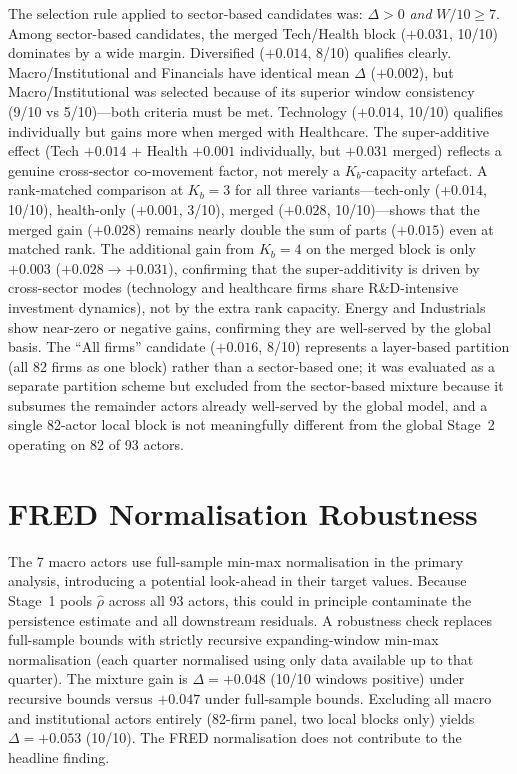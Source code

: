 \documentclass[11pt,a4paper]{article}
\begin{document}
The selection rule applied to sector-based candidates was: $\Delta > 0$ \emph{and} $W/10 \geq 7$. Among sector-based candidates, the merged Tech/Health block ($+0.031$, 10/10) dominates by a wide margin. Diversified ($+0.014$, 8/10) qualifies clearly. Macro/Institutional and Financials have identical mean $\Delta$ ($+0.002$), but Macro/Institutional was selected because of its superior window consistency (9/10 vs 5/10)---both criteria must be met. Technology ($+0.014$, 10/10) qualifies individually but gains more when merged with Healthcare. The super-additive effect (Tech $+0.014$ + Health $+0.001$ individually, but $+0.031$ merged) reflects a genuine cross-sector co-movement factor, not merely a $K_b$-capacity artefact. A rank-matched comparison at $K_b = 3$ for all three variants---tech-only ($+0.014$, 10/10), health-only ($+0.001$, 3/10), merged ($+0.028$, 10/10)---shows that the merged gain ($+0.028$) remains nearly double the sum of parts ($+0.015$) even at matched rank. The additional gain from $K_b = 4$ on the merged block is only $+0.003$ ($+0.028 \to +0.031$), confirming that the super-additivity is driven by cross-sector modes (technology and healthcare firms share R\&D-intensive investment dynamics), not by the extra rank capacity. Energy and Industrials show near-zero or negative gains, confirming they are well-served by the global basis. The ``All firms'' candidate ($+0.016$, 8/10) represents a layer-based partition (all 82 firms as one block) rather than a sector-based one; it was evaluated as a separate partition scheme but excluded from the sector-based mixture because it subsumes the remainder actors already well-served by the global model, and a single 82-actor local block is not meaningfully different from the global Stage~2 operating on 82 of 93 actors.

\section{FRED Normalisation Robustness}
\label{app:fred}

The 7 macro actors use full-sample min-max normalisation in the primary analysis, introducing a potential look-ahead in their target values. Because Stage~1 pools $\hat\rho$ across all 93 actors, this could in principle contaminate the persistence estimate and all downstream residuals. A robustness check replaces full-sample bounds with strictly recursive expanding-window min-max normalisation (each quarter normalised using only data available up to that quarter). The mixture gain is $\Delta = +0.048$ (10/10 windows positive) under recursive bounds versus $+0.047$ under full-sample bounds. Excluding all macro and institutional actors entirely (82-firm panel, two local blocks only) yields $\Delta = +0.053$ (10/10). The FRED normalisation does not contribute to the headline finding.
\end{document}
